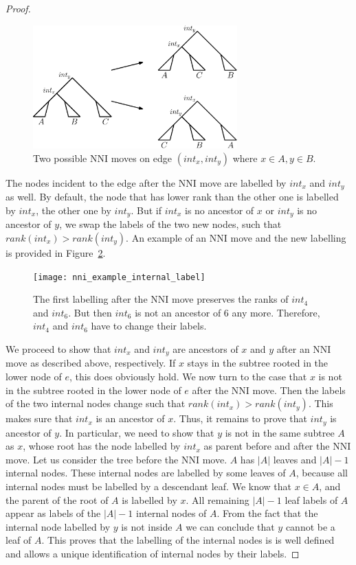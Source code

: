 \documentclass[11pt, a4paper]{article}
\newcommand{\nni}{\mathrm{NNI}}
\begin{document}
\begin{proof}
	\begin{figure}[H]
		\centering
		\includegraphics[width=0.7\textwidth]{nni_moves_internal_label}
		\caption{Two possible $\nni$ moves on edge $(int_x, int_y)$ where $x \in A, y \in B$.
		}
		\label{fig:nni_moves}
	\end{figure}

	The nodes incident to the edge after the $\nni$ move are labelled by $int_x$ and $int_y$ as well.
	By default, the node that has lower rank than the other one is labelled by $int_x$, the other one by $int_y$.
	But if $int_x$ is no ancestor of $x$ or $int_y$ is no ancestor of $y$, we swap the labels of the two new nodes, such that $rank(int_x) > rank(int_y)$.
	An example of an $\nni$ move and the new labelling is provided in Figure~\ref{fig:nni_example_internal_label}.

	\begin{figure}[H]
		\centering
		\texttt{[image: nni\_example\_internal\_label]}
		\caption{The first labelling after the $\nni$ move preserves the ranks of $int_4$ and $int_6$.
		But then $int_6$ is not an ancestor of $6$ any more.
		Therefore, $int_4$ and $int_6$ have to change their labels.
		}
		\label{fig:nni_example_internal_label}
	\end{figure}

	We proceed to show that $int_x$ and $int_y$ are ancestors of $x$ and $y$ after an $\nni$ move as described above, respectively.
	If $x$ stays in the subtree rooted in the lower node of $e$, this does obviously hold.
	We now turn to the case that $x$ is not in the subtree rooted in the lower node of $e$ after the $\nni$ move.
	Then the labels of the two internal nodes change such that $rank(int_x) > rank(int_y)$.
	This makes sure that $int_x$ is an ancestor of $x$.
	Thus, it remains to prove that $int_y$ is ancestor of $y$.
	In particular, we need to show that $y$ is not in the same subtree $A$ as $x$, whose root has the node labelled by $int_x$ as parent before and after the $\nni$ move.
	Let us consider the tree before the $\nni$ move.
	$A$ has $|A|$ leaves and $|A| - 1$ internal nodes.
	These internal nodes are labelled by some leaves of $A$, because all internal nodes must be labelled by a descendant leaf.
	We know that $x \in A$, and the parent of the root of $A$ is labelled by $x$.
	All remaining $|A|-1$ leaf labels of $A$ appear as labels of the $|A|-1$ internal nodes of $A$.
	From the fact that the internal node labelled by $y$ is not inside $A$ we can conclude that $y$ cannot be a leaf of $A$.
	This proves that the labelling of the internal nodes is is well defined and allows a unique identification of internal nodes by their labels.


\end{proof}
\end{document}
